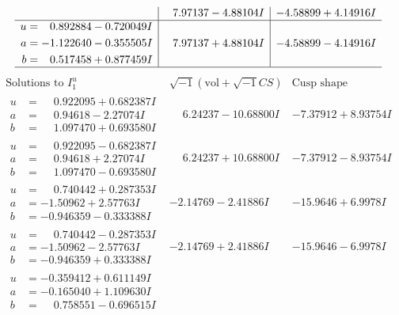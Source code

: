\documentclass[1p]{elsarticle_modified}
\theoremstyle{definition}
\newcommand{\I}{\sqrt{-1}}
\begin{document}
$$\begin{array}{c|c|c}
 & \phantom{-}7.97137 - 4.88104 I & -4.58899 + 4.14916 I \\ \hline\begin{aligned}
u &= \phantom{-}0.892884 - 0.720049 I \\
a &= -1.122640 - 0.355505 I \\
b &= \phantom{-}0.517458 + 0.877459 I\end{aligned}
 & \phantom{-}7.97137 + 4.88104 I & -4.58899 - 4.14916 I\\
 \hline 
 \end{array}$$\newpage$$\begin{array}{c|c|c}  
\text{Solutions to }I^u_{1}& \I (\text{vol} + \sqrt{-1}CS) & \text{Cusp shape}\\
 \hline 
\begin{aligned}
u &= \phantom{-}0.922095 + 0.682387 I \\
a &= \phantom{-}0.94618 - 2.27074 I \\
b &= \phantom{-}1.097470 + 0.693580 I\end{aligned}
 & \phantom{-}6.24237 - 10.68800 I & -7.37912 + 8.93754 I \\ \hline\begin{aligned}
u &= \phantom{-}0.922095 - 0.682387 I \\
a &= \phantom{-}0.94618 + 2.27074 I \\
b &= \phantom{-}1.097470 - 0.693580 I\end{aligned}
 & \phantom{-}6.24237 + 10.68800 I & -7.37912 - 8.93754 I \\ \hline\begin{aligned}
u &= \phantom{-}0.740442 + 0.287353 I \\
a &= -1.50962 + 2.57763 I \\
b &= -0.946359 - 0.333388 I\end{aligned}
 & -2.14769 - 2.41886 I & -15.9646 + 6.9978 I \\ \hline\begin{aligned}
u &= \phantom{-}0.740442 - 0.287353 I \\
a &= -1.50962 - 2.57763 I \\
b &= -0.946359 + 0.333388 I\end{aligned}
 & -2.14769 + 2.41886 I & -15.9646 - 6.9978 I \\ \hline\begin{aligned}
u &= -0.359412 + 0.611149 I \\
a &= -0.165040 + 1.109630 I \\
b &= \phantom{-}0.758551 - 0.696515 I\end{aligned}

\end{array}$$
\end{document}
